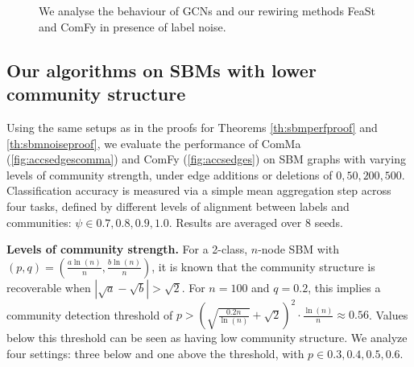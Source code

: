 \begin{figure}[h]
   \centering
   \hspace*{0pt}\hfill
   \hfill
   \hfill\hspace*{0pt}
   \\
   \hspace*{0pt}\hfill
   \hfill
   \hfill\hspace*{0pt}\\ 
   \caption{We analyse the behaviour of GCNs and our rewiring methods FeaSt and ComFy in presence of label noise.}
   \label{fig:labelnoise}
\end{figure}




\subsection{Our algorithms on SBMs with lower community structure} \label{app:comfyonsbm}
Using the same setups as in the proofs for Theorems \ref{th:sbmperfproof} and \ref{th:sbmnoiseproof}, we evaluate the performance of ComMa (\autoref{fig:accsedgescomma}) and ComFy (\autoref{fig:accsedges}) on SBM graphs with varying levels of community strength, under edge additions or deletions of ${0,50,200,500}$. Classification accuracy is measured via a simple mean aggregation step across four tasks, defined by different levels of alignment between labels and communities: $\psi \in {0.7,0.8,0.9,1.0}$. Results are averaged over 8 seeds.


\textbf{Levels of community strength.} For a 2-class, $n$-node SBM with $(p,q) = \left(\frac{a\ln(n)}{n}, \frac{b\ln(n)}{n}\right)$, it is known \citep[Thm. 13]{JMLR:v18:16-480} that the community structure is recoverable when $|\sqrt{a} - \sqrt{b}| > \sqrt{2}$. For $n=100$ and $q=0.2$, this implies a community detection threshold of $p > \left(\sqrt{\frac{0.2n}{\ln(n)}} + \sqrt{2}\right)^2 \cdot \frac{\ln(n)}{n} \approx 0.56$. Values below this threshold can be seen as having low community structure. We analyze four settings: three below and one above the threshold, with $p \in {0.3, 0.4, 0.5, 0.6}$.



